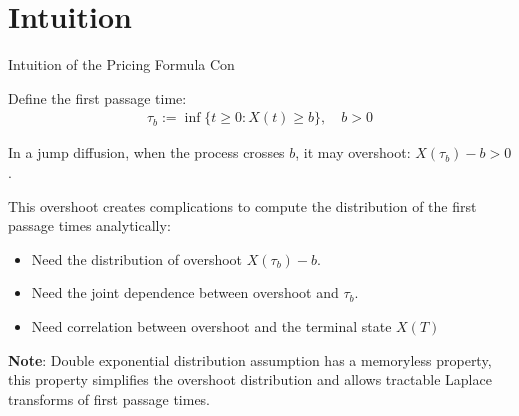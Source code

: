 \documentclass{beamer}
\begin{document}
\section{Intuition}
\begin{frame}{Intuition of the Pricing Formula Con}


     {\footnotesize \footnotesize
    \par Define the first passage time:
    \begin{align*}
        \tau_{b} := \inf\{t \geq 0 : X(t) \geq b\}, \quad b > 0
    \end{align*}
    \par In a jump diffusion, when the process crosses \( b \), it may overshoot: $X(\tau_{b}) - b > 0$.
    \vspace{1em}
    \par This overshoot creates complications to compute the distribution of the first passage
times analytically: 
    \begin{itemize}
        \item Need the distribution of overshoot \( X(\tau_{b}) - b \).
        \item Need the joint dependence between overshoot and \( \tau_{b} \).
        \item Need correlation between overshoot and the terminal state \( X(T) \)
    \end{itemize}
    \vspace{1em}
    \par \textbf{Note}: Double exponential distribution assumption has a memoryless property, this property 
    simplifies the overshoot distribution and allows tractable Laplace transforms of first passage times.
    }
    
\end{frame}
\end{document}
